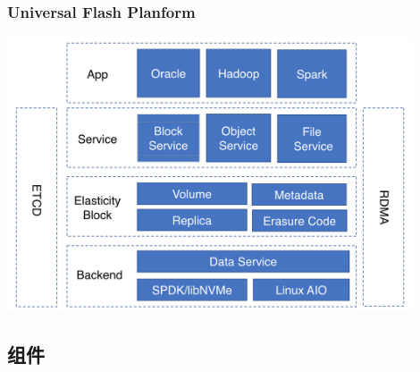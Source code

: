 \documentclass[UTF8,8pt,xcolor=dvipsnames]{beamer}
\begin{document}
\begin{frame}[fragile]
    \frametitle{Universal Flash Planform}
    \begin{center}
        \includegraphics[width=0.9\textwidth]{../imgs/universal-flash.png}
    \end{center}
\end{frame}

\subsection{组件}
\end{document}
